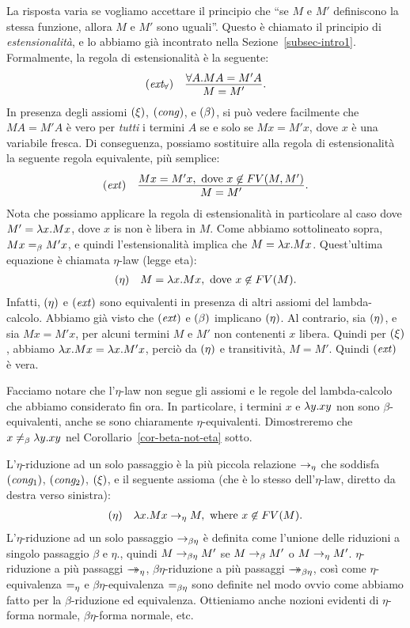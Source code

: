 \documentclass{article}
\begin{document}
La risposta varia se vogliamo accettare il principio che
``se $M$ e $M'$ definiscono la stessa funzione, allora $M$ e $M'$ sono
uguali''. Questo \`e chiamato il principio di {\em estensionalit\`a}, e lo
abbiamo gi\`a incontrato nella Sezione~\ref{subsec-intro1}. Formalmente,
la regola di estensionalit\`a \`e la seguente:
\[ \begin{array}{lc}
  \trule{ext$_\forall$} & \deriv{\forall A.MA=M'A}{M=M'}.
\end{array}
\]
In presenza degli assiomi $\textrm{(\textit{$\xi$\/})}$, $\textrm{(\textit{cong\/})}$, e
$\textrm{(\textit{$\beta$\/})}$, si pu\`o vedere facilmente che $MA=M'A$ \`e vero per {\em
  tutti} i termini $A$ se e solo se $Mx=M'x$, dove $x$ \`e una variabile
fresca. Di conseguenza, possiamo sostituire alla regola di estensionalit\`a 
la seguente regola equivalente, pi\`u semplice:
\[ \begin{array}{lc}
  \trule{ext} & \deriv{Mx=M'x, \mbox{ dove $x\not\in\FV{M,M'}$}}{M=M'}.
\end{array}
\]
Nota che possiamo applicare la regola di estensionalit\`a in particolare al
caso dove $M'=\lambda x.Mx$, dove $x$ is non \`e libera in $M$. Come abbiamo
sottolineato sopra, $Mx=_{\beta} M'x$, e quindi l'estensionalit\`a implica che
$M=\lambda x.Mx$. Quest'ultima equazione \`e chiamata $\eta$-law (legge eta):
\[ \begin{array}{lc}
  \textrm{(\textit{$\eta$\/})} & M=\lambda x.Mx, \mbox{ dove $x\not\in FV(M)$}.
\end{array}
\]
Infatti, $\textrm{(\textit{$\eta$\/})}$ e $\textrm{(\textit{ext\/})}$ sono equivalenti in
presenza di altri assiomi del lambda-calcolo. Abbiamo gi\`a
visto che $\textrm{(\textit{ext\/})}$ e $\textrm{(\textit{$\beta$\/})}$ implicano $\textrm{(\textit{$\eta$\/})}$.
Al contrario, sia $\textrm{(\textit{$\eta$\/})}$, e sia $Mx=M'x$, per alcuni
termini $M$ e $M'$ non contenenti $x$ libera.  Quindi per $\textrm{(\textit{$\xi$\/})}$,
abbiamo $\lambda x.Mx=\lambda x.M'x$, perci\`o da $\textrm{(\textit{$\eta$\/})}$ e
transitivit\`a, $M=M'$. Quindi $\textrm{(\textit{ext\/})}$ \`e vera.

Facciamo notare che l'$\eta$-law non segue gli assiomi e le regole
del lambda-calcolo che abbiamo considerato fin ora. In particolare,
i termini $x$ e $\lambda y.xy$ non sono $\beta$-equivalenti, anche se
sono chiaramente $\eta$-equivalenti. Dimostreremo che $x\not=_{\beta} \lambda
y.xy$ nel Corollario~\ref{cor-beta-not-eta} sotto.

L'$\eta$-riduzione ad un solo passaggio \`e la pi\`u piccola relazione $\rightarrow_{\eta}$
che soddisfa $\textrm{(\textit{cong$_1$\/})}$, $\textrm{(\textit{cong$_2$\/})}$, $\textrm{(\textit{$\xi$\/})}$, e
il seguente assioma (che \`e lo stesso dell'$\eta$-law, diretto
da destra verso sinistra):
\[ \begin{array}{lc}\label{page-def-eta}
  \textrm{(\textit{$\eta$\/})} & \lambda x.Mx\rightarrow_{\eta} M, \mbox{ where $x\not\in FV(M)$}.
\end{array}
\]
L'$\eta$-riduzione ad un solo passaggio $\rightarrow_{\beta\eta}$ \`e definita come l'unione
delle riduzioni a singolo passaggio $\beta$ e $\eta$., quindi $M\rightarrow_{\beta\eta} M'$ se
$M\rightarrow_{\beta} M'$ o $M\rightarrow_{\eta} M'$. $\eta$-riduzione a pi\`u passaggi $\mathrel{\rightarrow\!\!\!\!\!\rightarrow}_{\eta}$,
$\beta\eta$-riduzione a pi\`u passaggi $\mathrel{\rightarrow\!\!\!\!\!\rightarrow}_{\beta\eta}$, cos\`i come
$\eta$-equivalenza $=_{\eta}$ e $\beta\eta$-equivalenza $=_{\beta\eta}$ sono
definite nel modo ovvio come abbiamo fatto per la $\beta$-riduzione ed
equivalenza. Ottieniamo anche nozioni evidenti di $\eta$-forma normale,
$\beta\eta$-forma normale, etc.
\end{document}
